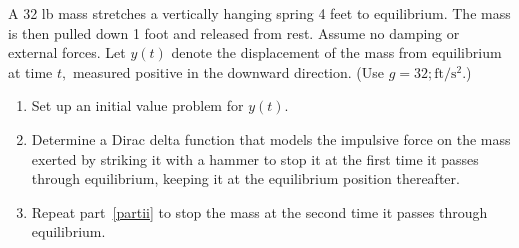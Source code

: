\begin{Exercise}
 \Question\label{7-5-11} A 32 lb mass stretches a vertically hanging spring  4 feet to equilibrium. The mass is then pulled down 1 foot and released from rest. Assume no damping or external forces. Let $y(t)$ denote the displacement of the mass from equilibrium at time $t,$ measured positive in the downward direction. (Use $g= 32 ;\text{ft}/\text{s}^2$.)
\begin{enumerate}[label =(\roman*)]
	\item Set up an initial value problem for $y(t).$ 
	\item\label{partii} Determine a Dirac delta function that models the impulsive force on the mass exerted by striking it with a hammer to stop it at the first time it passes through equilibrium, keeping it at the equilibrium position thereafter.
	\item Repeat part~\ref{partii} to stop the mass at the second time it passes through equilibrium.
\end{enumerate}

 


\end{Exercise}

